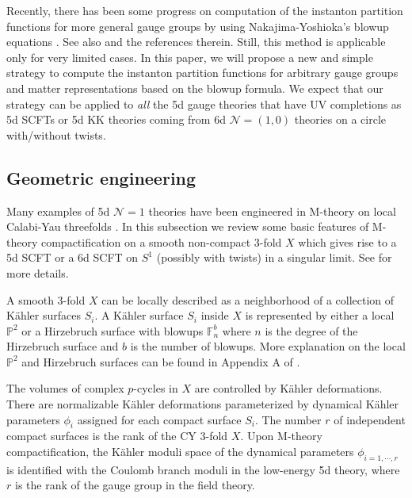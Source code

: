 Recently, there has been some progress on computation of the instanton partition functions for more general gauge groups by using Nakajima-Yoshioka's blowup equations \cite{Nakajima:2003pg}. See also \cite{Huang:2017mis,Gu:2018gmy,Kim:2019uqw} and the references therein. Still, this method is applicable only for very limited cases. In this paper, we will propose a new and simple strategy to compute the instanton partition functions for arbitrary gauge groups and matter representations based on the blowup formula. We expect that our strategy can be applied to {\it all} the 5d gauge theories that have UV completions as 5d SCFTs or 5d KK theories coming from 6d $\mathcal{N}=(1,0)$ theories on a circle with/without twists.


\subsection{Geometric engineering}

Many examples of 5d $\mathcal{N}=1$ theories have been engineered in M-theory on local Calabi-Yau threefolds \cite{Morrison:1996xf,Douglas:1996xp,Intriligator:1997pq}. In this subsection we review some basic features of M-theory compactification on a smooth non-compact 3-fold $X$ which gives rise to a 5d SCFT or a 6d SCFT on $S^1$ (possibly with twists) in a singular limit. See \cite{Jefferson:2018irk,Bhardwaj:2019fzv} for more details.

A smooth 3-fold $X$ can be locally described as a neighborhood of a collection of K\"ahler surfaces $S_i$. A K\"ahler surface $S_i$ inside $X$ is represented by either a local $\mathbb{P}^2$ or a Hirzebruch surface with blowups $\mathbb{F}_{n}^b$ where $n$ is the degree of the Hirzebruch surface and $b$ is the number of blowups. More explanation on the local $\mathbb{P}^2$ and Hirzebruch surfaces can be found in Appendix A of \cite{Bhardwaj:2019fzv}.

The volumes of complex $p$-cycles in $X$ are controlled by K\"ahler deformations. There are normalizable K\"ahler deformations parameterized by dynamical K\"ahler parameters $\phi_i$ assigned for each compact surface $S_i$. The number $r$ of independent compact surfaces is the rank of the CY 3-fold $X$. Upon M-theory compactification, the K\"ahler moduli space of the dynamical parameters $\phi_{i=1,\cdots,r}$ is identified with the Coulomb branch moduli in the low-energy 5d theory, where $r$ is the rank of the gauge group in the field theory.

